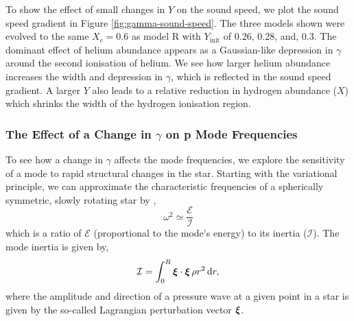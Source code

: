 To show the effect of small changes in \(Y\) on the sound speed, we plot the sound speed gradient in Figure \ref{fig:gamma-sound-speed}. The three models shown were evolved to the same \(X_c = 0.6\) as model R with \(Y_\mathrm{init}\) of 0.26, 0.28, and, 0.3. The dominant effect of helium abundance appears as a Gaussian-like depression in \(\gamma\) around the second ionisation of helium. We see how larger helium abundance increases the width and depression in \(\gamma\), which is reflected in the sound speed gradient. A larger \(Y\) also leads to a relative reduction in hydrogen abundance (\(X\)) which shrinks the width of the hydrogen ionisation region.

\subsubsection{The Effect of a Change in \(\gamma\) on p Mode Frequencies}

To see how a change in \(\gamma\) affects the mode frequencies, we explore the sensitivity of a mode to rapid structural changes in the star. Starting with the variational principle, we can approximate the characteristic frequencies of a spherically symmetric, slowly rotating star by \citep{Chandrasekhar1964},
%
\begin{equation}
    \omega^2 \simeq \frac{\mathcal{E}}{\mathcal{I}}\label{eq:var-prin}
\end{equation}
%
which is a ratio of \(\mathcal{E}\) (proportional to the mode's energy)
%
%
to its inertia (\(\mathcal{I}\)). The mode inertia is given by,
%
\begin{equation}
    \mathcal{I} = \int_0^R \bm{\xi} \cdot \bm{\xi} \, \rho r^2 \, \mathrm{d} r,
\end{equation}
%
where the amplitude and direction of a pressure wave at a given point in a star is given by the so-called Lagrangian perturbation vector \(\bm{\xi}\). 

